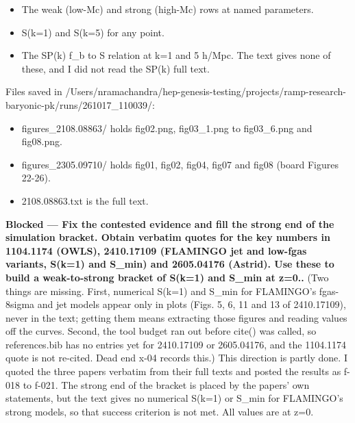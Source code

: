 \documentclass[11pt,a4paper]{article}
\begin{document}
\begin{itemize}
  \item The weak (low-Mc) and strong (high-Mc) rows at named parameters.
  \item S(k=1) and S(k=5) for any point.
  \item The SP(k) f\_b to S relation at k=1 and 5 h/Mpc.
The text gives none of these, and I did not read the SP(k) full text.

\end{itemize}
Files saved in /Users/nramachandra/hep-genesis-testing/projects/ramp-research-baryonic-pk/runs/261017\_110039/:

\begin{itemize}
  \item figures\_2108.08863/ holds fig02.png, fig03\_1.png to fig03\_6.png and fig08.png.
  \item figures\_2305.09710/ holds fig01, fig02, fig04, fig07 and fig08 (board Figures 22-26).
  \item 2108.08863.txt is the full text.
\end{itemize}
\textbf{Blocked --- Fix the contested evidence and fill the strong end of the simulation bracket. Obtain verbatim quotes for the key numbers in 1104.1174 (OWLS), 2410.17109 (FLAMINGO jet and low-fgas variants, S(k=1) and S\_min) and 2605.04176 (Astrid). Use these to build a weak-to-strong bracket of S(k=1) and S\_min at z=0..} (Two things are missing. First, numerical S(k=1) and S\_min for FLAMINGO's fgas-8sigma and jet models appear only in plots (Figs. 5, 6, 11 and 13 of 2410.17109), never in the text; getting them means extracting those figures and reading values off the curves. Second, the tool budget ran out before cite() was called, so references.bib has no entries yet for 2410.17109 or 2605.04176, and the 1104.1174 quote is not re-cited. Dead end x-04 records this.) This direction is partly done. I quoted the three papers verbatim from their full texts and posted the results as f-018 to f-021. The strong end of the bracket is placed by the papers' own statements, but the text gives no numerical S(k=1) or S\_min for FLAMINGO's strong models, so that success criterion is not met. All values are at z=0.
\end{document}
